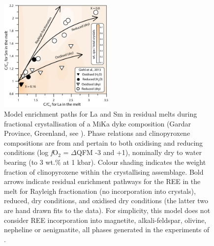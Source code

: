 \documentclass[review,authoryear,12pt]{elsarticle}
\newcommand{\fO}{\textit{f}O$_{2}$ }
\begin{document}
 \begin{figure}[t]
        \begin{center}
        \includegraphics[width=0.5\textwidth]{15_FractCryst_Giehl_NoContours.eps}
        \caption[La vs. Sm diagram showing the geochemical evolution of the MiKa dyke, Gardar province, Greenland]    
        {Model enrichment paths for La and Sm in residual melts during fractional crystallisation of a MiKa dyke composition (Gardar Province, Greenland, see \citealt{Marks2003}). Phase relations and clinopyroxene compositions are from \citet{Giehl2013} and pertain to both oxidising and reducing conditions (log \fO = $\Delta$QFM -3 and +1), nominally dry to water bearing (to 3 wt.\%  at 1 kbar). Colour shading indicates the weight fraction of clinopyroxene within the crystallising assemblage. Bold arrows indicate residual enrichment pathways for the REE in the melt for Rayleigh fractionation (no incorporation into crystals), reduced, dry conditions, and oxidised dry conditions (the latter two are hand drawn fits to the data). For simplicity, this model does not consider REE incorporation into magnetite, alkali-feldspar, olivine, nepheline or aenigmatite, all phases generated in the experiments of \citet{Giehl2013} \citep[see][]{Larsen1979,Kovalenko1988,Mahood1990}.}
        \label{15_Fract_Cryst}
        \end{center}
        \end{figure}
\end{document}
